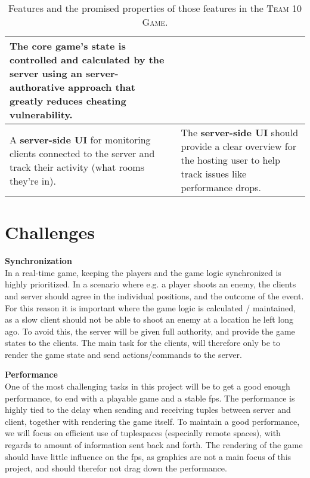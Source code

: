 \begin{table}[h]
\begin{tabular}{p{53mm}p{53mm}}
        The \textbf{core game}'s state is controlled and calculated by the server using an server-authorative approach that greatly reduces cheating vulnerability.  \\
        
        \hline
        
        A \textbf{server-side UI} for monitoring clients connected to the server and track their activity (what rooms they're in). 
        
        & The \textbf{server-side UI} should provide a clear overview for the hosting user to help track issues like performance drops. 
    
    \end{tabular}
    
    \caption{Features and the promised properties of those features in the \textsc{Team 10 Game}. }
    \label{tab:Team10Game}
\end{table}


\section{Challenges} \label{sec:challenges}
\textbf{Synchronization}\\
In a real-time game, keeping the players and the game logic synchronized is highly prioritized. In a scenario where e.g. a player shoots an enemy, the clients and server should agree in the individual positions, and the outcome of the event. For this reason it is important where the game logic is calculated / maintained, as a slow client should not be able to shoot an enemy at a location he left long ago. To avoid this, the server will be given full authority, and provide the game states to the clients. The main task for the clients, will therefore only be to render the game state and send actions/commands to the server.

\textbf{Performance}\\
One of the most challenging tasks in this project will be to get a good enough performance, to end with a playable game and a stable fps. The performance is highly tied to the delay when sending and receiving tuples between server and client, together with rendering the game itself. To maintain a good performance, we will focus on efficient use of tuplespaces (especially remote spaces), with regards to amount of information sent back and forth. The rendering of the game should have little influence on the fps, as graphics are not a main focus of this project, and should therefor not drag down the performance.

